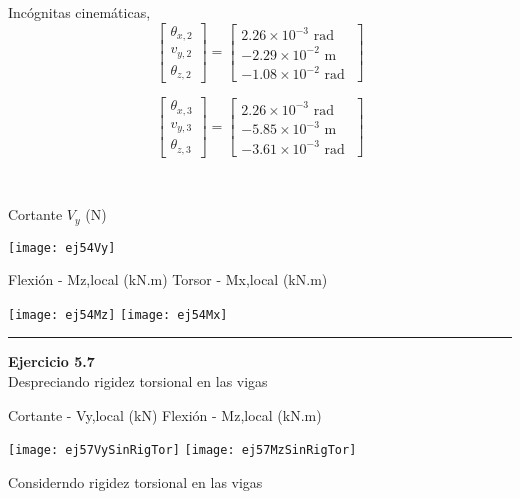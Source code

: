 \begin{minipage}{0.45\textwidth}
	Incógnitas cinemáticas,
	$$
	\left[
	\begin{matrix}
		\theta_{x,2} \\
		v_{y,2} \\
		\theta_{z,2}
	\end{matrix}
	\right]
	=
	\left[
	\begin{matrix}
		2.26\times 10^{-3} \text{ rad }\\
		-2.29\times 10^{-2} \text{ m }\\
		-1.08\times 10^{-2} \text{ rad }
	\end{matrix}
	\right]
	$$
	
	$$
	\left[
	\begin{matrix}
		\theta_{x,3} \\
		v_{y,3} \\
		\theta_{z,3}
	\end{matrix}
	\right]
	=
	\left[
	\begin{matrix}
		2.26\times 10^{-3} \text{ rad }\\
		-5.85\times 10^{-3} \text{ m }\\
		-3.61\times 10^{-3} \text{ rad }
	\end{matrix}
	\right]
	$$
\end{minipage}
~
\begin{minipage}{0.45\textwidth}
	Cortante $V_y$ (N)
	
	\texttt{[image: ej54Vy]}
\end{minipage}


Flexión - Mz,local (kN.m) \hfill  Torsor - Mx,local (kN.m)

\texttt{[image: ej54Mz]}
\texttt{[image: ej54Mx]}








\hrule
\vspace{5mm}
\textbf{Ejercicio 5.7}\\

Despreciando rigidez torsional en las vigas

\noindent
Cortante - Vy,local (kN)
\hfill
Flexión - Mz,local (kN.m)

\texttt{[image: ej57VySinRigTor]}
\texttt{[image: ej57MzSinRigTor]}


Considerndo rigidez torsional en las vigas


